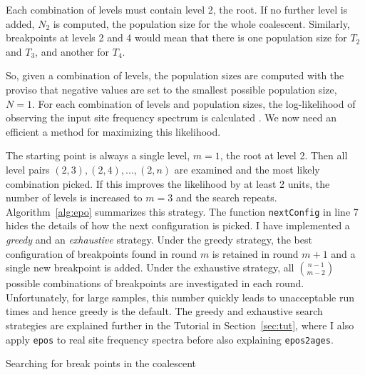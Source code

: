 \documentclass[a4paper, english]{article}
\newcommand{\ty}{\texttt}
\begin{document}
Each combination of levels must contain level 2, the root. If no
further level is added, $N_2$ is computed, the population size for the
whole coalescent. Similarly, breakpoints at levels 2 and 4 would mean
that there is one population size for $T_2$ and $T_3$, and another
for $T_4$.

So, given a combination of levels, the population sizes are computed
with the proviso that negative values are set to the smallest possible
population size, $N=1$. For each combination of levels and population
sizes, the log-likelihood of observing the input site frequency
spectrum is calculated \citep{lyn19:inf}. We now need an efficient a method
for maximizing this likelihood.

The starting point is always a single level, $m=1$, the root at level
2. Then all level pairs $(2,3), (2,4),...,(2,n)$ are examined and the
most likely combination picked. If this improves the likelihood by at
least 2 units, the number of levels is increased to $m=3$ and the
search repeats. Algorithm~\ref{alg:epo} summarizes this strategy. The
function \ty{nextConfig} in line 7 hides the details of how the next
configuration is picked. I have implemented a \emph{greedy} and an
\emph{exhaustive} strategy. Under the greedy strategy, the best
configuration of breakpoints found in round $m$ is retained in round
$m+1$ and a single new breakpoint is added. Under the exhaustive
strategy, all ${n-1\choose m-2}$ possible combinations of breakpoints
are investigated in each round. Unfortunately, for large samples, this
number quickly leads to unacceptable run times and hence greedy is the
default. The greedy and exhaustive search strategies are explained
further in the Tutorial in Section~\ref{sec:tut}, where I also apply
\ty{epos} to real site frequency spectra before also explaining
\ty{epos2ages}.

\begin{algorithm}
  \caption{Searching for break points in the coalescent}\label{alg:epo}
  
\end{algorithm}
\end{document}

